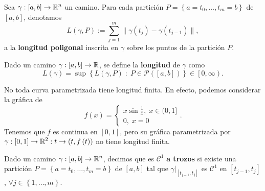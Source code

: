 \begin{definition}
	Sea $\displaystyle \gamma:\left[a,b\right] \to \mathbb{R}^{n} $ un camino. Para cada partición $\displaystyle P = \left\{ a=t_{0}, \ldots, t_{m} = b\right\}  $ de $\displaystyle \left[a,b\right]  $, denotamos
	\[L\left(\gamma, P\right):=\sum^{m}_{j = 1} \|\gamma\left(t_{j}\right)-\gamma\left(t_{j-1}\right)\|,\]
	a la \textbf{longitud poligonal} inscrita en $\displaystyle \gamma  $ sobre los puntos de la partición $\displaystyle P $. 
\end{definition}
\begin{definition}
	Dado un camino $\displaystyle \gamma:[a,b]\to \mathbb{R} $, se define la \textbf{longitud} de $\displaystyle \gamma  $ como 
	\[L\left(\gamma \right)= \sup \left\{ L\left(\gamma, P\right) \; : \; P \in \mathcal{P}\left(\left[a,b\right] \right)\right\} \in \left[0, \infty\right)  .\]
\end{definition}
\begin{observation}
No toda curva parametrizada tiene longitud finita. En efecto, podemos considerar la gráfica de 
\[f\left(x\right)=
\begin{cases}
	x\sin \frac{1}{x}, \; x \in (0,1] \\
	0, \; x = 0
\end{cases}
.\]
Tenemos que $\displaystyle f $ es continua en $\displaystyle \left[0,1\right]  $, pero su gráfica parametrizada por $\displaystyle \gamma : \left[0,1\right] \to \mathbb{R}^{2} : t \to \left(t, f\left(t\right)\right) $ no tiene longitud finita.
\end{observation}

\begin{definition}
	Dado un camino $\displaystyle \gamma:\left[a,b\right] \to \mathbb{R}^{n} $, decimos que es $\displaystyle \mathcal{C}^{1} $ \textbf{a trozos} si existe una partición $\displaystyle P = \left\{ a = t_{0}, \ldots, t_{m}= b\right\}  $ de $\displaystyle \left[a,b\right]  $ tal que $\displaystyle \gamma|_{\left[t_{j-1}, t_{j}\right] } $ es $\displaystyle \mathcal{C}^{1} $ en $\displaystyle \left[t_{j-1}, t_{j}\right]  $, $\displaystyle \forall j \in \left\{ 1, \ldots, m\right\}  $. 
\end{definition}

